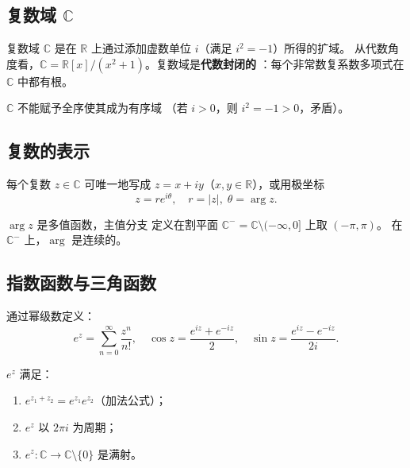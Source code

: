
\subsection{复数域 $\mathbb{C}$}

复数域 $\mathbb{C}$ 是在 $\mathbb{R}$ 上通过添加虚数单位 $i$（满足 $i^2 = -1$）所得的扩域。
从代数角度看，$\mathbb{C} = \mathbb{R}[x]/(x^2+1)$。复数域是\textbf{代数封闭的}
：每个非常数复系数多项式在 $\mathbb{C}$ 中都有根。

\begin{remark}
$\mathbb{C}$ 不能赋予全序使其成为有序域 （若 $i > 0$，则 $i^2 = -1 > 0$，矛盾）。
\end{remark}

\subsection{复数的表示}

每个复数 $z \in \mathbb{C}$ 可唯一地写成 $z = x + iy$（$x,y \in \mathbb{R}$），或用极坐标
\[
  z = r e^{i\theta}, \quad r = |z|,\; \theta = \arg z.
\]

\begin{definition}
$\arg z$ 是多值函数，主值分支  定义在割平面
$\mathbb{C}^- = \mathbb{C} \setminus (-\infty, 0]$ 上取 $(-\pi, \pi)$。
在 $\mathbb{C}^-$ 上，$\arg$ 是连续的。
\end{definition}

\subsection{指数函数与三角函数}

通过幂级数定义：
\[
  e^z = \sum_{n=0}^{\infty} \frac{z^n}{n!}, \quad
  \cos z = \frac{e^{iz} + e^{-iz}}{2}, \quad
  \sin z = \frac{e^{iz} - e^{-iz}}{2i}.
\]

\begin{lemma}[指数函数的基本性质]
$e^z$ 满足：
\begin{enumerate}  \item $e^{z_1 + z_2} = e^{z_1} e^{z_2}$（加法公式）；
  \item $e^z$ 以 $2\pi i$ 为周期；
  \item $e^z : \mathbb{C} \to \mathbb{C} \setminus \{0\}$ 是满射。
\end{enumerate}
\end{lemma}

